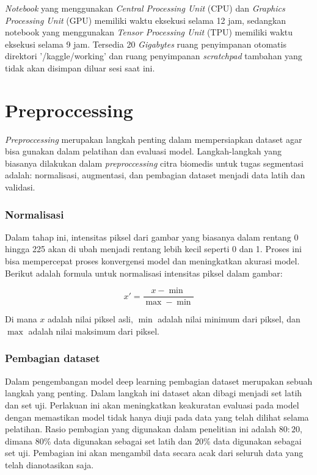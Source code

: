 \noindent \textit{Notebook} yang menggunakan \textit{Central Processing Unit }(CPU) dan \textit{Graphics Processing Unit} (GPU) memiliki waktu eksekusi selama 12 jam, sedangkan notebook yang menggunakan \textit{Tensor Processing Unit} (TPU) memiliki waktu eksekusi selama 9 jam. Tersedia 20 \textit{Gigabytes} ruang penyimpanan otomatis direktori '/kaggle/working' dan ruang penyimpanan \textit{scratchpad} tambahan yang tidak akan disimpan diluar sesi saat ini.


\section{Preproccessing}

\noindent \textit{Preproccessing} merupakan langkah penting dalam mempersiapkan dataset agar bisa gunakan dalam pelatihan dan evaluasi model. Langkah-langkah yang biasanya dilakukan dalam \textit{preproccessing} citra biomedis untuk tugas segmentasi adalah: normalisasi, augmentasi, dan pembagian dataset menjadi data latih dan validasi.

\subsubsection{Normalisasi}

\noindent Dalam tahap ini, intensitas piksel dari gambar yang biasanya dalam rentang 0 hingga 225 akan di ubah menjadi rentang lebih kecil seperti 0 dan 1. Proses ini bisa mempercepat proses konvergensi model dan meningkatkan akurasi model. Berikut adalah formula untuk normalisasi intensitas piksel dalam gambar:

\begin{equation}
	x' = \frac{x - \min}{\max - \min}
\end{equation}

Di mana \( x \) adalah nilai piksel asli, \( \min \) adalah nilai minimum dari piksel, dan \(\max\) adalah nilai maksimum dari piksel.


\subsubsection{Pembagian dataset}

\noindent Dalam pengembangan model deep learning pembagian dataset merupakan sebuah langkah yang penting. Dalam langkah ini dataset akan dibagi menjadi set latih dan set uji. Perlakuan ini akan meningkatkan keakuratan evaluasi pada model dengan memastikan model tidak hanya diuji pada data yang telah dilihat selama pelatihan. Rasio pembagian yang digunakan dalam penelitian ini adalah \(80:20\), dimana 80\% data digunakan sebagai set latih dan 20\% data digunakan sebagai set uji. Pembagian ini akan mengambil data secara acak dari seluruh data yang telah dianotasikan saja. 

